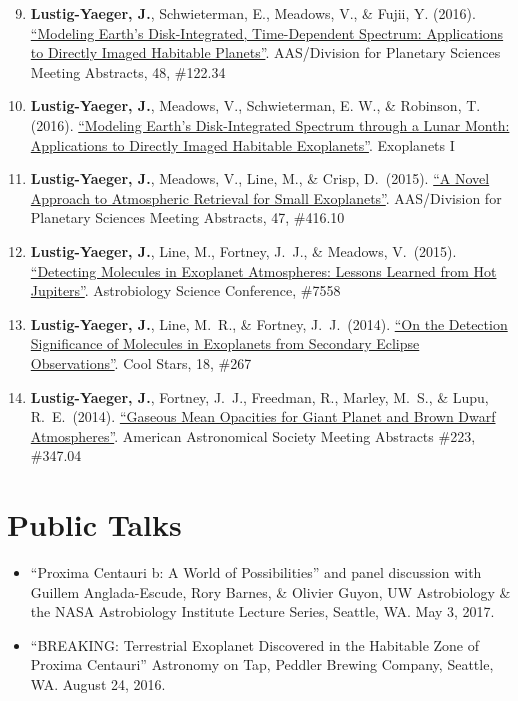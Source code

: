 \documentclass[margin,10pt]{res}
\newenvironment{benumerate}[1]{
    \let\oldItem\item
    \def\item{\addtocounter{enumi}{-2}\oldItem}
    \begin{enumerate}
    \setcounter{enumi}{#1}
    \addtocounter{enumi}{1}
}{
    \end{enumerate}
}
\begin{document}
\begin{resume}
\begin{benumerate}{8}
                    \item \textbf{Lustig-Yaeger, J.}, Schwieterman, E., Meadows, V., \& Fujii, Y. (2016). \href{http://adsabs.harvard.edu/abs/2016DPS....4812234L}{``Modeling Earth's Disk-Integrated, Time-Dependent Spectrum: Applications to Directly Imaged Habitable Planets''}. AAS/Division for Planetary Sciences Meeting Abstracts, 48, \#122.34
                    \item \textbf{Lustig-Yaeger, J.}, Meadows, V., Schwieterman, E. W., \& Robinson, T. (2016). \href{http://www.exoplanetscience.org/speakers}{``Modeling Earth’s Disk-Integrated Spectrum through a Lunar Month: 
                    Applications to Directly Imaged Habitable Exoplanets''}. Exoplanets I
                    \item \textbf{Lustig-Yaeger, J.}, Meadows, V., Line, M., \& Crisp, D.\ (2015). \href{http://adsabs.harvard.edu/abs/2015DPS....4741610L}{``A Novel Approach to Atmospheric Retrieval for Small Exoplanets''}. AAS/Division for Planetary Sciences Meeting Abstracts, 47, \#416.10
                    \item \textbf{Lustig-Yaeger, J.}, Line, M., Fortney, J.~J., \& Meadows, V.\ (2015). \href{http://www.hou.usra.edu/meetings/abscicon2015/pdf/7558.pdf}{``Detecting Molecules in Exoplanet Atmospheres: Lessons Learned from Hot Jupiters''}. Astrobiology Science Conference, \#7558
                    \item \textbf{Lustig-Yaeger, J.},  Line, M.~R., \& Fortney, J.~J.\ (2014). \href{http://www2.lowell.edu/workshops/coolstars18/abstracts-posters/poster-abstract-267.html}{``On the Detection Significance of Molecules in Exoplanets from Secondary Eclipse Observations''}. Cool Stars, 18, \#267
                    \item \textbf{Lustig-Yaeger, J.}, Fortney, J.~J., Freedman, R., Marley, M.~S., \& Lupu, R.~E.\ (2014). \href{http://adsabs.harvard.edu/abs/2014AAS...22334704L}{``Gaseous Mean Opacities for Giant Planet and Brown Dwarf Atmospheres''}. American Astronomical Society Meeting Abstracts \#223, \#347.04\\
                 \end{benumerate}
                 
 \section{Public Talks}
                \begin{itemize}  
                    \item ``Proxima Centauri b: A World of Possibilities'' and panel discussion with Guillem Anglada-Escude, Rory Barnes, \& Olivier Guyon, UW Astrobiology \& the NASA Astrobiology Institute Lecture Series, Seattle, WA. May 3, 2017.
                    \item ``BREAKING: Terrestrial Exoplanet Discovered in the Habitable Zone of Proxima Centauri'' Astronomy on Tap, Peddler Brewing Company, Seattle, WA. August 24, 2016.\\
                 \end{itemize}
                 

\end{resume}
\end{document}
